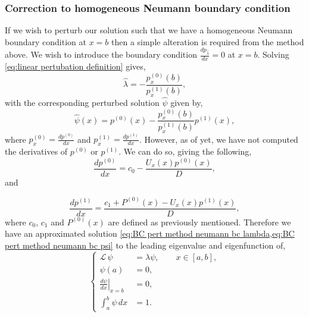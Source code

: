 \documentclass[11pt]{amsart}
\begin{document}
\subsubsection*{Correction to homogeneous Neumann boundary condition}
If we wish to perturb our solution such that we have a homogeneous Neumann boundary condition at $x=b$ then a simple alteration is required from the method above. We wish to introduce the boundary condition $ \frac{dp_{\hat{\lambda}}}{dx} = 0$ at $x=b$. Solving \cref{eq:linear pertubation definition} gives,
\begin{equation}
    \label{eq:BC pert method neumann bc lambda}
    \hat{\lambda} = -\frac{p^{(0)}_x(b)}{p^{(1)}_x(b)},
\end{equation}
with the corresponding perturbed solution $\hat{\psi}$ given by,
\begin{equation}
    \label{eq:BC pert method neumann bc psi}
    \hat{\psi}(x) = p^{(0)}(x)-\frac{p^{(0)}_x(b)}{p^{(1)}_x(b)}p^{(1)}(x),
\end{equation}
where $p^{(0)}_x=\frac{dp^{(0)}}{dx}$ and $p^{(1)}_x=\frac{dp^{(1)}}{dx}$.
However, as of yet, we have not computed the derivatives of $p^{(0)}$ or $p^{(1)}$. We can do so, giving the following,
\begin{equation*}
    \frac{dp^{(0)}}{dx} = c_0 - \frac{U_x(x)p^{(0)}(x)}{D},
\end{equation*}
and

\begin{equation*}
    \frac{dp^{(1)}}{dx} = \frac{c_1+P^{(0)}(x)-U_x(x)p^{(1)}(x)}{D},
\end{equation*}
where $c_0$, $c_1$ and $P^{(0)}(x)$ are defined as previously mentioned. Therefore we have an approximated solution \cref{eq:BC pert method neumann bc lambda,eq:BC pert method neumann bc psi} to the leading eigenvalue and eigenfunction of,
\begin{equation}
\label{eq:BC pert method neumann bc conditions}
\left\{
\begin{aligned}
\mathcal{L}\, \psi &= \lambda\psi , \qquad x \in [a, b], \\
\psi(a) &= 0, \\
\left.\frac{d\psi}{dx}\right|_{x=b} &= 0, \\
\int_a^b\psi \, dx &= 1.
\end{aligned}
\right.
\end{equation}
\end{document}
